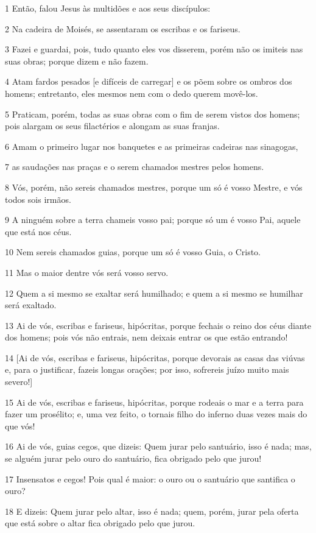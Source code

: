 \par 1 Então, falou Jesus às multidões e aos seus discípulos:
\par 2 Na cadeira de Moisés, se assentaram os escribas e os fariseus.
\par 3 Fazei e guardai, pois, tudo quanto eles vos disserem, porém não os imiteis nas suas obras; porque dizem e não fazem.
\par 4 Atam fardos pesados [e difíceis de carregar] e os põem sobre os ombros dos homens; entretanto, eles mesmos nem com o dedo querem movê-los.
\par 5 Praticam, porém, todas as suas obras com o fim de serem vistos dos homens; pois alargam os seus filactérios e alongam as suas franjas.
\par 6 Amam o primeiro lugar nos banquetes e as primeiras cadeiras nas sinagogas,
\par 7 as saudações nas praças e o serem chamados mestres pelos homens.
\par 8 Vós, porém, não sereis chamados mestres, porque um só é vosso Mestre, e vós todos sois irmãos.
\par 9 A ninguém sobre a terra chameis vosso pai; porque só um é vosso Pai, aquele que está nos céus.
\par 10 Nem sereis chamados guias, porque um só é vosso Guia, o Cristo.
\par 11 Mas o maior dentre vós será vosso servo.
\par 12 Quem a si mesmo se exaltar será humilhado; e quem a si mesmo se humilhar será exaltado.
\par 13 Ai de vós, escribas e fariseus, hipócritas, porque fechais o reino dos céus diante dos homens; pois vós não entrais, nem deixais entrar os que estão entrando!
\par 14 [Ai de vós, escribas e fariseus, hipócritas, porque devorais as casas das viúvas e, para o justificar, fazeis longas orações; por isso, sofrereis juízo muito mais severo!]
\par 15 Ai de vós, escribas e fariseus, hipócritas, porque rodeais o mar e a terra para fazer um prosélito; e, uma vez feito, o tornais filho do inferno duas vezes mais do que vós!
\par 16 Ai de vós, guias cegos, que dizeis: Quem jurar pelo santuário, isso é nada; mas, se alguém jurar pelo ouro do santuário, fica obrigado pelo que jurou!
\par 17 Insensatos e cegos! Pois qual é maior: o ouro ou o santuário que santifica o ouro?
\par 18 E dizeis: Quem jurar pelo altar, isso é nada; quem, porém, jurar pela oferta que está sobre o altar fica obrigado pelo que jurou.
